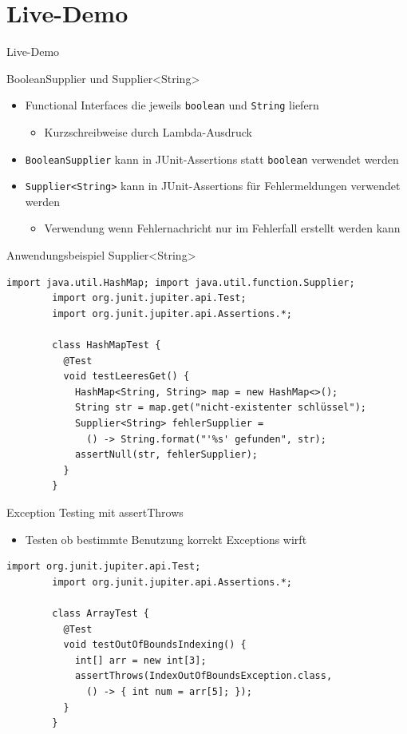 \documentclass[utf8,t,aspectratio=169]{beamer}
\begin{document}
	\section{Live-Demo}
    \begin{frame}[c]
      \Huge
      \centering
      Live-Demo
    \end{frame}
    \begin{frame}[fragile]{BooleanSupplier und Supplier<String>}
      \begin{itemize}
        \item Functional Interfaces die jeweils \lstinline{boolean} und \lstinline{String} liefern
          \begin{itemize}
            \item Kurzschreibweise durch Lambda-Ausdruck
          \end{itemize}
        \item \lstinline{BooleanSupplier} kann in JUnit-Assertions statt \lstinline{boolean} verwendet werden
        \item \lstinline{Supplier<String>} kann in JUnit-Assertions für Fehlermeldungen verwendet werden
          \begin{itemize}
            \item Verwendung wenn Fehlernachricht nur im Fehlerfall erstellt werden kann
          \end{itemize}
      \end{itemize}
    \end{frame}
    \begin{frame}[fragile]{Anwendungsbeispiel Supplier<String>}
      \begin{lstlisting}[gobble=8]
        import java.util.HashMap; import java.util.function.Supplier;
        import org.junit.jupiter.api.Test;
        import org.junit.jupiter.api.Assertions.*;

        class HashMapTest {
          @Test
          void testLeeresGet() {
            HashMap<String, String> map = new HashMap<>();
            String str = map.get("nicht-existenter schlüssel");
            Supplier<String> fehlerSupplier =
              () -> String.format("'%s' gefunden", str);
            assertNull(str, fehlerSupplier);
          }
        }
      \end{lstlisting}
    \end{frame}
    \begin{frame}[fragile]{Exception Testing mit assertThrows}
      \begin{itemize}
        \item Testen ob bestimmte Benutzung korrekt Exceptions wirft
      \end{itemize}
      \begin{lstlisting}[gobble=8]
        import org.junit.jupiter.api.Test;
        import org.junit.jupiter.api.Assertions.*;

        class ArrayTest {
          @Test
          void testOutOfBoundsIndexing() {
            int[] arr = new int[3];
            assertThrows(IndexOutOfBoundsException.class,
              () -> { int num = arr[5]; });
          }
        }
      \end{lstlisting}
    \end{frame}
\end{document}
